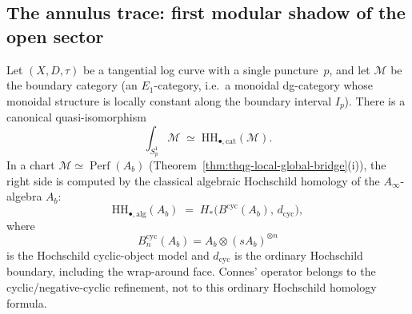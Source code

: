 \subsection{The annulus trace: first modular shadow of the open sector}
\label{subsec:thqg-annulus-trace}

\begin{theorem}
\label{thm:thqg-annulus-trace}
Let $(X, D, \tau)$ be a tangential log curve with a single
puncture~$p$, and let $\mathcal{M}$ be the boundary category
\textup{(}an $E_1$-category, i.e.\ a monoidal dg-category whose
monoidal structure is locally constant along the boundary interval
$I_p$\textup{)}. There is a canonical quasi-isomorphism
\begin{equation}\label{eq:thqg-annulus-trace}
\int_{S^1_p} \mathcal{M}
\;\simeq\;
\mathrm{HH}_{\bullet,\mathrm{cat}}(\mathcal{M}).
\end{equation}
In a chart $\mathcal{M} \simeq \operatorname{Perf}(A_b)$
\textup{(}Theorem~\textup{\ref{thm:thqg-local-global-bridge}(i)}\textup{)},
the right side is computed by the classical algebraic Hochschild
homology of the $A_\infty$-algebra $A_b$:
\begin{equation}\label{eq:thqg-hochschild-bar-model}
\mathrm{HH}_{\bullet,\mathrm{alg}}(A_b)
\;=\; H_*\!\bigl(B^{\mathrm{cyc}}(A_b), \, d_{\mathrm{cyc}}\bigr),
\end{equation}
where
\[
B^{\mathrm{cyc}}_n(A_b)=A_b\otimes (sA_b)^{\otimes n}
\]
is the Hochschild cyclic-object model and \(d_{\mathrm{cyc}}\) is the
ordinary Hochschild boundary, including the wrap-around face.  Connes'
operator belongs to the cyclic/negative-cyclic refinement, not to this
ordinary Hochschild homology formula.
\end{theorem}

